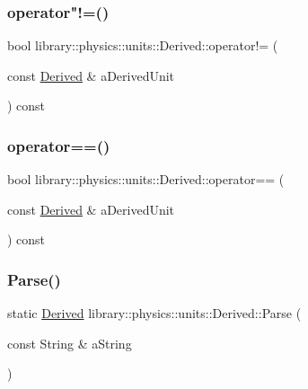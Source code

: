 \subsubsection{\texorpdfstring{operator"!=()}{operator!=()}}
{\footnotesize\ttfamily bool library\+::physics\+::units\+::\+Derived\+::operator!= (\begin{DoxyParamCaption}\item[{const \hyperlink{classlibrary_1_1physics_1_1units_1_1_derived}{Derived} \&}]{a\+Derived\+Unit }\end{DoxyParamCaption}) const}

\mbox{\label{classlibrary_1_1physics_1_1units_1_1_derived_a2cee9ae2cea2395bf21e377ee62eac67}} 
\subsubsection{\texorpdfstring{operator==()}{operator==()}}
{\footnotesize\ttfamily bool library\+::physics\+::units\+::\+Derived\+::operator== (\begin{DoxyParamCaption}\item[{const \hyperlink{classlibrary_1_1physics_1_1units_1_1_derived}{Derived} \&}]{a\+Derived\+Unit }\end{DoxyParamCaption}) const}

\mbox{\label{classlibrary_1_1physics_1_1units_1_1_derived_a45b4ceae1f94e6877d15e67bf97572ee}} 
\subsubsection{\texorpdfstring{Parse()}{Parse()}}
{\footnotesize\ttfamily static \hyperlink{classlibrary_1_1physics_1_1units_1_1_derived}{Derived} library\+::physics\+::units\+::\+Derived\+::\+Parse (\begin{DoxyParamCaption}\item[{const String \&}]{a\+String }\end{DoxyParamCaption})\hspace{0.3cm}{\ttfamily [static]}}

